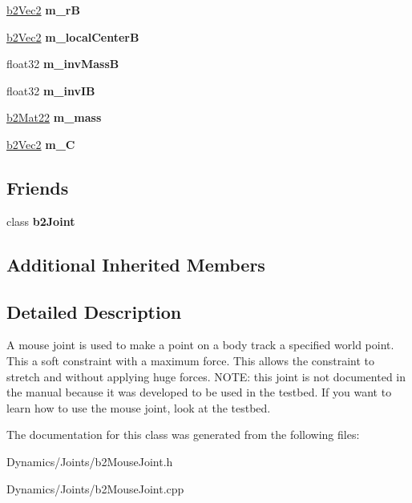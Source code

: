 \begin{DoxyCompactItemize}
\mbox{\hyperlink{structb2Vec2}{b2\+Vec2}} {\bfseries m\+\_\+rB}
\item 
\mbox{\label{classb2MouseJoint_ad9947876df55f4b4e7d435941234e22e}} 
\mbox{\hyperlink{structb2Vec2}{b2\+Vec2}} {\bfseries m\+\_\+local\+CenterB}
\item 
\mbox{\label{classb2MouseJoint_a84c405322a35b0f2649071cdcd7be0fb}} 
float32 {\bfseries m\+\_\+inv\+MassB}
\item 
\mbox{\label{classb2MouseJoint_a0a4959ae588d0071d97424e36f15228e}} 
float32 {\bfseries m\+\_\+inv\+IB}
\item 
\mbox{\label{classb2MouseJoint_a628b7a7a2cd2b50313daea30baf47c4e}} 
\mbox{\hyperlink{structb2Mat22}{b2\+Mat22}} {\bfseries m\+\_\+mass}
\item 
\mbox{\label{classb2MouseJoint_a7ea02e17cdde70717e84bf44614275fb}} 
\mbox{\hyperlink{structb2Vec2}{b2\+Vec2}} {\bfseries m\+\_\+C}
\end{DoxyCompactItemize}
\subsection*{Friends}
\begin{DoxyCompactItemize}
\item 
\mbox{\label{classb2MouseJoint_a54ade8ed3d794298108d7f4c4e4793fa}} 
class {\bfseries b2\+Joint}
\end{DoxyCompactItemize}
\subsection*{Additional Inherited Members}


\subsection{Detailed Description}
A mouse joint is used to make a point on a body track a specified world point. This a soft constraint with a maximum force. This allows the constraint to stretch and without applying huge forces. N\+O\+TE\+: this joint is not documented in the manual because it was developed to be used in the testbed. If you want to learn how to use the mouse joint, look at the testbed. 

The documentation for this class was generated from the following files\+:\begin{DoxyCompactItemize}
\item 
Dynamics/\+Joints/b2\+Mouse\+Joint.\+h\item 
Dynamics/\+Joints/b2\+Mouse\+Joint.\+cpp\end{DoxyCompactItemize}
